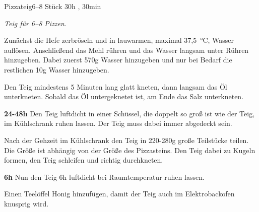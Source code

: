 \documentclass[../recipe-collections/cooking.tex]{subfiles}
\begin{document}
\begin{recipe}{Pizzateig}{6–8 Stück }{30h , 30min }

  \freeform{}\textit{Teig für 6–8 Pizzen.}


  Zunächst die Hefe zerbröseln und in lauwarmen, maximal 37,5 °C, Wasser auflösen.
  Anschließend das Mehl rühren und das Wasser langsam unter Rühren hinzugeben.
  Dabei zuerst 570g Wasser hinzugeben und nur bei Bedarf die restlichen 10g Wasser hinzugeben.


  Den Teig mindestens 5 Minuten lang glatt kneten, dann langsam das Öl unterkneten.
  Sobald das Öl untergeknetet ist, am Ende das Salz unterkneten.

  \newstep{}\textbf{24-48h}
  Den Teig luftdicht in einer Schüssel, die doppelt so groß ist wie der Teig, im Kühlschrank ruhen lassen.
  Der Teig muss dabei immer abgedeckt sein.

  \newstep{}Nach der Gehzeit im Kühlschrank den Teig in 220-280g große Teilstücke teilen.
  Die Größe ist abhängig von der Größe des Pizzasteins.
  Den Teig dabei zu Kugeln formen, den Teig schleifen und richtig durchkneten.

  \newstep{}\textbf{6h}
  Nun den Teig 6h luftdicht bei Raumtemperatur ruhen lassen.

  \freeform{}\hrulefill{}

  \freeform{}
  Einen Teelöffel Honig hinzufügen, damit der Teig auch im Elektrobackofen knusprig wird.

\end{recipe}
\end{document}
